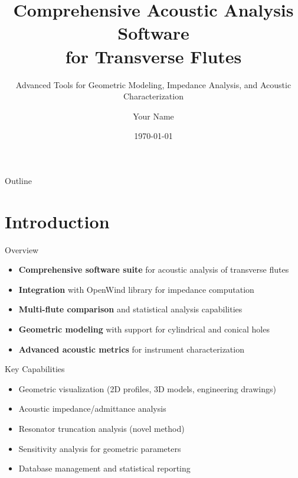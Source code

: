 \documentclass[aspectratio=169,10pt]{beamer}
\title[Traverso Analysis Software]{Comprehensive Acoustic Analysis Software\\for Transverse Flutes}
\subtitle{Advanced Tools for Geometric Modeling, Impedance Analysis, and Acoustic Characterization}
\author[Your Name]{Your Name}
\institute[Your Institution]{Your Institution}
\date{\today}
\begin{document}
\begin{frame}
\titlepage
\end{frame}

\begin{frame}{Outline}
\tableofcontents
\end{frame}

\section{Introduction}

\begin{frame}{Overview}
\begin{itemize}
    \item \textbf{Comprehensive software suite} for acoustic analysis of transverse flutes
    \item \textbf{Integration} with OpenWind library for impedance computation
    \item \textbf{Multi-flute comparison} and statistical analysis capabilities
    \item \textbf{Geometric modeling} with support for cylindrical and conical holes
    \item \textbf{Advanced acoustic metrics} for instrument characterization
\end{itemize}

\vspace{0.5cm}
\begin{block}{Key Capabilities}
    \begin{itemize}
        \item Geometric visualization (2D profiles, 3D models, engineering drawings)
        \item Acoustic impedance/admittance analysis
        \item Resonator truncation analysis (novel method)
        \item Sensitivity analysis for geometric parameters
        \item Database management and statistical reporting
    \end{itemize}
\end{block}
\end{frame}
\end{document}
